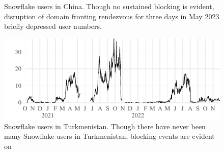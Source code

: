 \documentclass[letterpaper,twocolumn]{article}
\begin{document}
\begin{figure}
{\begin{minipage}[b][\textheight][b]{\linewidth}
\caption{
Snowflake users in China.
Though no sustained blocking is evident,
disruption of domain fronting rendezvous
for three days in May 2023 briefly
depressed user numbers.
\label{fig:client-counts-cn}
}
\vfill
\includegraphics{figures/users/users-tm}
\caption{
Snowflake users in Turkmenistan.
Though there have never been many Snowflake users in Turkmenistan,
blocking events are evident on
}
\end{minipage}}
\end{figure}
\end{document}
